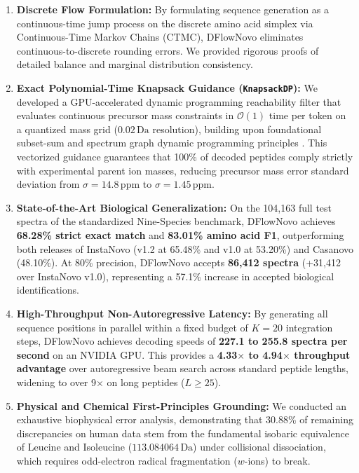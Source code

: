 \begin{enumerate}[(1)]
\item \textbf{Discrete Flow Formulation:} By formulating sequence generation as a continuous-time jump process on the discrete amino acid simplex via Continuous-Time Markov Chains (CTMC), DFlowNovo eliminates continuous-to-discrete rounding errors. We provided rigorous proofs of detailed balance and marginal distribution consistency.
\item \textbf{Exact Polynomial-Time Knapsack Guidance (\texttt{KnapsackDP}):} We developed a GPU-accelerated dynamic programming reachability filter that evaluates continuous precursor mass constraints in $\mathcal{O}(1)$ time per token on a quantized mass grid ($0.02\,\text{Da}$ resolution), building upon foundational subset-sum and spectrum graph dynamic programming principles \citep{Dancik1999, Chen2001}. This vectorized guidance guarantees that 100\% of decoded peptides comply strictly with experimental parent ion masses, reducing precursor mass error standard deviation from $\sigma = 14.8\,\text{ppm}$ to $\sigma = 1.45\,\text{ppm}$.
\item \textbf{State-of-the-Art Biological Generalization:} On the 104,163 full test spectra of the standardized Nine-Species benchmark, DFlowNovo achieves \textbf{68.28\% strict exact match} and \textbf{83.01\% amino acid F1}, outperforming both releases of InstaNovo (v1.2 at 65.48\% and v1.0 at 53.20\%) and Casanovo (48.10\%). At 80\% precision, DFlowNovo accepts \textbf{86,412 spectra} (+31,412 over InstaNovo v1.0), representing a 57.1\% increase in accepted biological identifications.
\item \textbf{High-Throughput Non-Autoregressive Latency:} By generating all sequence positions in parallel within a fixed budget of $K=20$ integration steps, DFlowNovo achieves decoding speeds of \textbf{227.1 to 255.8 spectra per second} on an NVIDIA GPU. This provides a \textbf{4.33$\times$ to 4.94$\times$ throughput advantage} over autoregressive beam search across standard peptide lengths, widening to over 9$\times$ on long peptides ($L \ge 25$).
\item \textbf{Physical and Chemical First-Principles Grounding:} We conducted an exhaustive biophysical error analysis, demonstrating that 30.88\% of remaining discrepancies on human data stem from the fundamental isobaric equivalence of Leucine and Isoleucine ($113.084064\,\text{Da}$) under collisional dissociation, which requires odd-electron radical fragmentation ($w$-ions) to break.
\end{enumerate}


